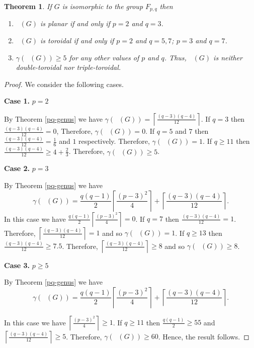 \documentclass[reqno,12pt]{amsart}
\theoremstyle{plain}
\newtheorem{thm}{Theorem}[section]
\theoremstyle{definition}
\newcommand{\coeng}{\mathop{\mathcal{E}_c^-}}
\begin{document}
\begin{thm}
If $G$ is isomorphic to the group $F_{p, q}$ then 
\begin{enumerate}
\item $\coeng(G)$ is planar if and only if $p = 2$ and $q = 3$.
\item $\coeng(G)$ is toroidal if and only if $p = 2$ and $q = 5, 7$; $p = 3$ and $q = 7$.
\item $\gamma(\coeng(G)) \geq 5$ for any other values of $p$ and $q$. Thus, $\coeng(G)$ is neither double-toroidal nor  triple-toroidal.
\end{enumerate} 
\end{thm}
\begin{proof}
We consider the following cases.

\noindent \textbf{Case 1.} $p = 2$ 	

By Theorem \ref{pq-genus} we have	$\gamma(\coeng(G)) = \left\lceil \frac{(q-3)(q-4)}{12}\right\rceil$. If $q = 3$ then  $\frac{(q-3)(q-4)}{12} = 0$, Therefore, $\gamma(\coeng(G)) = 0$. If $q = 5$ and $7$ then $\frac{(q-3)(q-4)}{12} = \frac{1}{6}$ and $1$ respectively. Therefore, $\gamma(\coeng(G)) = 1$. If $q \geq 11$ then $\frac{(q-3)(q-4)}{12} \geq 4 + \frac{2}{3}$. Therefore, $\gamma(\coeng(G))\geq 5$. 

\noindent \textbf{Case 2.} $p = 3$ 	

By Theorem \ref{pq-genus} we have	
\[
\gamma(\coeng(G)) = \frac{q(q - 1)}{2}\left\lceil\frac{(p-3)^2}{4}\right\rceil + \left\lceil \frac{(q-3)(q-4)}{12}\right\rceil.
\]
In this case we have $\frac{q(q - 1)}{2}\left\lceil\frac{(p-3)^2}{4}\right
\rceil = 0$.  If $q = 7$ then $\frac{(q-3)(q-4)}{12} = 1$. Therefore, $\left\lceil \frac{(q-3)(q-4)}{12}\right\rceil = 1$ and so $\gamma(\coeng(G)) = 1$.  If $q \geq 13$ then $\frac{(q-3)(q-4)}{12} \geq 7.5$. Therefore, $\left\lceil \frac{(q-3)(q-4)}{12}\right\rceil \geq 8$ and so $\gamma(\coeng(G)) \geq 8$.

\noindent \textbf{Case 3.} $p \geq 5$ 	

By Theorem \ref{pq-genus} we have	
\[
\gamma(\coeng(G)) = \frac{q(q - 1)}{2}\left\lceil\frac{(p-3)^2}{4}\right\rceil + \left\lceil \frac{(q-3)(q-4)}{12}\right\rceil.
\]

In this case we have  $\left\lceil\frac{(p-3)^2}{4}\right
\rceil \geq 1$. If $q \geq 11$ then $\frac{q(q - 1)}{2} \geq 55$ and $\left\lceil \frac{(q-3)(q-4)}{12}\right\rceil \geq 5$. Therefore, $\gamma(\coeng(G)) \geq 60$. Hence, the result follows.
\end{proof}
\end{document}
